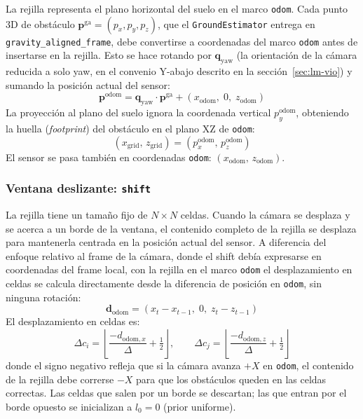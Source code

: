 La rejilla representa el plano horizontal del suelo en el marco \texttt{odom}.
Cada punto 3D de obstáculo $\mathbf{p}^{\text{ga}} = (p_x, p_y, p_z)$, que
el \texttt{GroundEstimator} entrega en \texttt{gravity\_aligned\_frame}, debe
convertirse a coordenadas del marco \texttt{odom} antes de insertarse en la
rejilla. Esto se hace rotando por $\mathbf{q}_{\text{yaw}}$ (la orientación
de la cámara reducida a solo yaw, en el convenio Y-abajo descrito en la
sección~\ref{sec:lm-vio}) y sumando la posición actual del sensor:
%
\begin{equation}
  \label{eq:ga-to-odom}
  \mathbf{p}^{\text{odom}} = \mathbf{q}_{\text{yaw}} \cdot \mathbf{p}^{\text{ga}}
  + (x_{\text{odom}},\; 0,\; z_{\text{odom}})
\end{equation}
%
La proyección al plano del suelo ignora la coordenada vertical $p_y^{\text{odom}}$,
obteniendo la huella (\emph{footprint}) del obstáculo en el plano XZ de
\texttt{odom}:
%
\begin{equation}
  \label{eq:ga-to-grid}
  (x_{\text{grid}},\, z_{\text{grid}}) = (p_x^{\text{odom}},\, p_z^{\text{odom}})
\end{equation}
%
El sensor se pasa también en coordenadas \texttt{odom}: $(x_{\text{odom}},\,
z_{\text{odom}})$.

\subsubsection{Ventana deslizante: \texttt{shift}}
\label{subsubsec:lm-v5-shift}

La rejilla tiene un tamaño fijo de $N \times N$ celdas. Cuando la cámara se
desplaza y se acerca a un borde de la ventana, el contenido completo de la
rejilla se desplaza para mantenerla centrada en la posición actual del sensor.
A diferencia del enfoque relativo al frame de la cámara, donde el shift debía
expresarse en coordenadas del frame local, con la rejilla en el marco
\texttt{odom} el desplazamiento en celdas se calcula directamente desde la
diferencia de posición en \texttt{odom}, sin ninguna rotación:
%
\begin{equation}
  \label{eq:odom-delta}
  \mathbf{d}_{\text{odom}} = (x_t - x_{t-1},\; 0,\; z_t - z_{t-1})
\end{equation}
%
El desplazamiento en celdas es:
%
\begin{equation}
  \label{eq:shift-cells}
  \Delta c_i = \left\lfloor \frac{-d_{\text{odom},x}}{\Delta} + \tfrac{1}{2} \right\rfloor,
  \qquad
  \Delta c_j = \left\lfloor \frac{-d_{\text{odom},z}}{\Delta} + \tfrac{1}{2} \right\rfloor
\end{equation}
%
donde el signo negativo refleja que si la cámara avanza $+X$ en
\texttt{odom}, el contenido de la rejilla debe correrse $-X$ para que los
obstáculos queden en las celdas correctas. Las celdas que salen por un borde
se descartan; las que entran por el borde opuesto se inicializan a
$l_0 = 0$ (prior uniforme).

